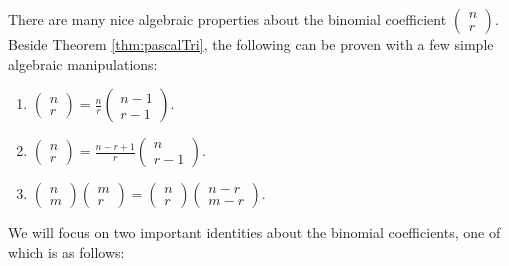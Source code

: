 \documentclass[math]{amznotes}
\theoremstyle{remark}
\begin{document}
There are many nice algebraic properties about the binomial coefficient $\left(\begin{smallmatrix}
    n \\
    r
\end{smallmatrix}\right)$. Beside Theorem \ref{thm:pascalTri}, the following can be proven with a few simple algebraic manipulations:
\begin{enumerate}
    \item $\begin{pmatrix}
        n \\
        r
    \end{pmatrix} = \frac{n}{r}\begin{pmatrix}
        n - 1 \\
        r - 1
    \end{pmatrix}$.
    \item $\begin{pmatrix}
        n \\
        r
    \end{pmatrix} = \frac{n - r + 1}{r}\begin{pmatrix}
        n \\
        r - 1
    \end{pmatrix}$.
    \item $\begin{pmatrix}
        n \\
        m
    \end{pmatrix}\begin{pmatrix}
        m \\
        r
    \end{pmatrix} = \begin{pmatrix}
        n \\
        r
    \end{pmatrix}\begin{pmatrix}
        n - r \\
        m - r
    \end{pmatrix}$.
\end{enumerate}
We will focus on two important identities about the binomial coefficients, one of which is as follows:
\end{document}
